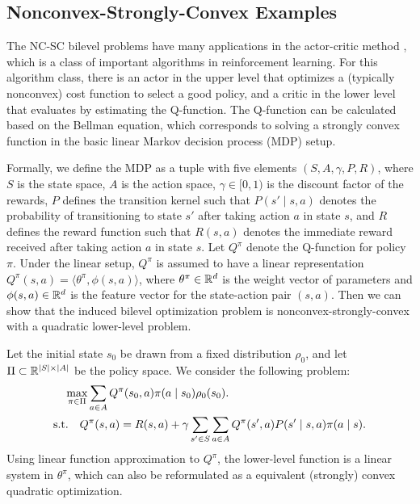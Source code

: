 \subsection{Nonconvex-Strongly-Convex Examples} \label{apx:exmple-NC-SC}

The NC-SC bilevel problems have many applications in the actor-critic method \citep{konda1999actor}, which is a class of important algorithms in reinforcement learning.  For this algorithm class, there is an actor in the upper level that optimizes a (typically nonconvex) cost function to select a good policy, and a critic in the lower level that evaluates by estimating the Q-function. The Q-function can be calculated based on the Bellman equation, which corresponds to solving a strongly convex function in the basic linear Markov decision process (MDP) setup.

Formally, we define the MDP as a tuple with five elements $(S,A, \gamma, P, R)$, where $S$ is the state space, $A$ is the action space, $\gamma \in [0,1)$ is the discount factor of the rewards, $P$ defines the transition kernel such that $P(s' \mid s,a)$ denotes the probability of transitioning to state $s'$ after taking action $a$
in state $s$, and $R$ defines the reward function such that $R(s,a) $ denotes the immediate reward received after taking action $a$ in state $s$. 
Let $Q^\pi$ denote the Q-function for policy $\pi$. 
Under the linear setup, $Q^\pi$ is assumed to have a linear representation $Q^\pi(s,a) = \langle \theta^\pi, \phi(s,a) \rangle$, where $ \theta^\pi \in {\mathbb{R}}^d$ is the weight vector of parameters and $\phi(s,a) \in {\mathbb{R}}^d$ is the 
feature vector for the state-action pair $(s,a)$. Then we can show that the induced bilevel optimization problem is nonconvex-strongly-convex with a quadratic lower-level problem.

\begin{exmp}
Let the initial state $s_0$ be drawn from a fixed distribution $\rho_0$, and let $\Pi \subset {\mathbb{R}}^{\vert S \vert \times \vert A \vert}$ be the policy space. We consider the following problem:
\begin{align*}
    &\quad \max_{\pi \in \Pi} \sum_{a \in A} Q^{\pi}(s_0,a) \pi(a \mid s_0) \rho_0(s_0). \\
    &{\rm s.t.} \quad Q^\pi(s,a) = R(s,a) + \gamma \sum_{s' \in S}  \sum_{a \in A} Q^\pi(s',a) P(s' \mid s ,a) \pi(a \mid s).
\end{align*}
Using linear function approximation to $Q^\pi$, the lower-level function is a linear system in $\theta^\pi$, which can also be reformulated as a equivalent (strongly) convex quadratic optimization.
\end{exmp}

